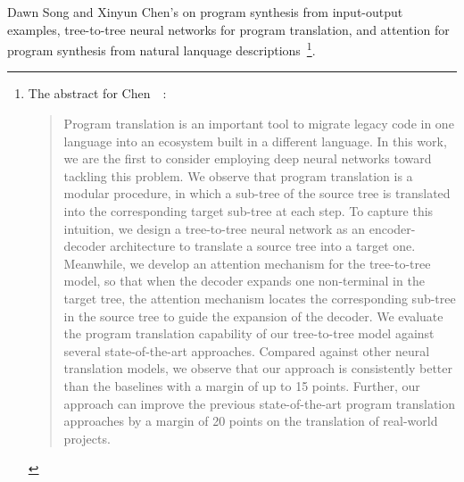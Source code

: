 Dawn Song and Xinyun Chen's {} on program synthesis from input-output examples, tree-to-tree neural networks for program translation, and attention for program synthesis from natural lanquage descriptions~\cite{ChenetalICLR-18b}\footnote{%
%
  The abstract for Chen~\etal{}~\cite{ChenetalICLR-18b}:
%
  \begin{quotation}
%
    Program translation is an important tool to migrate legacy code in one language into an ecosystem built in a different language. In this work, we are the first to consider employing deep neural networks toward tackling this problem. We observe that program translation is a modular procedure, in which a sub-tree of the source tree is translated into the corresponding target sub-tree at each step. To capture this intuition, we design a tree-to-tree neural network as an encoder-decoder architecture to translate a source tree into a target one. Meanwhile, we develop an attention mechanism for the tree-to-tree model, so that when the decoder expands one non-terminal in the target tree, the attention mechanism locates the corresponding sub-tree in the source tree to guide the expansion of the decoder. We evaluate the program translation capability of our tree-to-tree model against several state-of-the-art approaches. Compared against other neural translation models, we observe that our approach is consistently better than the baselines with a margin of up to 15 points. Further, our approach can improve the previous state-of-the-art program translation approaches by a margin of 20 points on the translation of real-world projects.
%
  \end{quotation}}.




